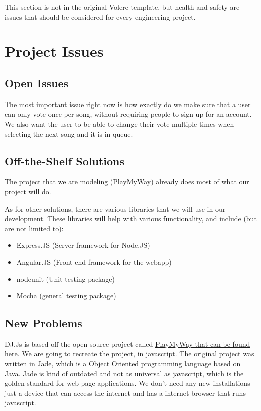 \documentclass[12pt, titlepage]{article}
\begin{document}
This section is not in the original Volere template, but health and safety are
issues that should be considered for every engineering project.

\section{Project Issues}

\subsection{Open Issues}

The most important issue right now is how exactly do we make sure that a user can only vote once per song, without requiring people to sign up for an account. We also want the user to be able to change their vote multiple times when selecting the next song and it is in queue.

\subsection{Off-the-Shelf Solutions}

The project that we are modeling (PlayMyWay) already does most of what our project will do.

As for other solutions, there are various libraries that we will use in our
development. These libraries will help with various functionality, and include
(but are not limited to):
\begin{itemize}
\item Express.JS (Server framework for Node.JS)
\item Angular.JS (Front-end framework for the webapp)
\item nodeunit (Unit testing package)
\item Mocha (general testing package)
\end{itemize}
\subsection{New Problems}

DJ.Js is based off the open source project called \href{https://github.com/malithsen/playmyway}{PlayMyWay that can be found here.} We are going to recreate the project, in javascript. The original project was written in Jade, which is a Object Oriented programming language based on Java. Jade is kind of outdated and not as universal as javascript, which is the golden standard for web page applications. We don't need any new installations just a device that can access the internet and has a internet browser that runs javascript.
\end{document}
